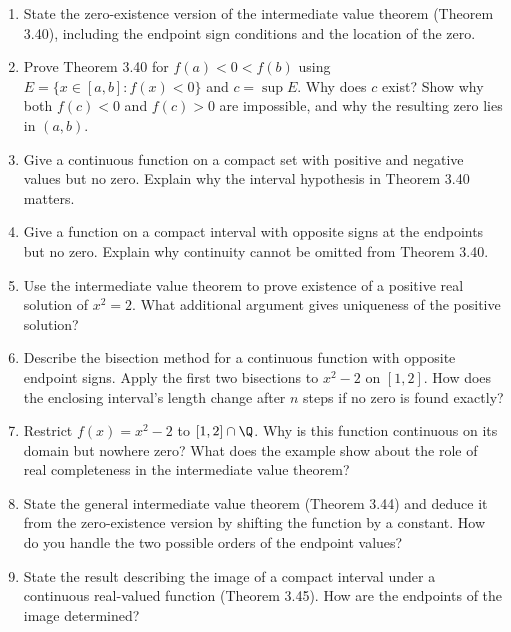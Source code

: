 \begin{enumerate}[resume]
  \item State the zero-existence version of the intermediate value
    theorem (Theorem 3.40), including the endpoint sign conditions
    and the location of the zero.

  \item Prove Theorem 3.40 for \(f(a)<0<f(b)\) using
    \(E=\{x\in[a,b]:f(x)<0\}\) and \(c=\sup E\).
    Why does \(c\) exist? Show why both \(f(c)<0\) and \(f(c)>0\)
    are impossible, and why the resulting zero lies in \((a,b)\).

  \item Give a continuous function on a compact set with positive
    and negative values but no zero. Explain why the interval
    hypothesis in Theorem 3.40 matters.

  \item Give a function on a compact interval with opposite signs at
    the endpoints but no zero. Explain why continuity cannot be
    omitted from Theorem 3.40.

  \item Use the intermediate value theorem to prove existence of a
    positive real solution of \(x^2=2\). What additional argument
    gives uniqueness of the positive solution?

  \item Describe the bisection method for a continuous function with
    opposite endpoint signs. Apply the first two bisections to
    \(x^2-2\) on \([1,2]\). How does the enclosing interval's
    length change after \(n\) steps if no zero is found exactly?

  \item Restrict \(f(x)=x^2-2\) to \([1,2]\cap\Q\).
    Why is this function continuous on its domain but nowhere zero?
    What does the example show about the role of real completeness
    in the intermediate value theorem?

  \item State the general intermediate value theorem (Theorem 3.44)
    and deduce it from the zero-existence version by shifting the
    function by a constant. How do you handle the two possible orders
    of the endpoint values?

  \item State the result describing the image of a compact interval
    under a continuous real-valued function (Theorem 3.45).
    How are the endpoints of the image determined?


\end{enumerate}
